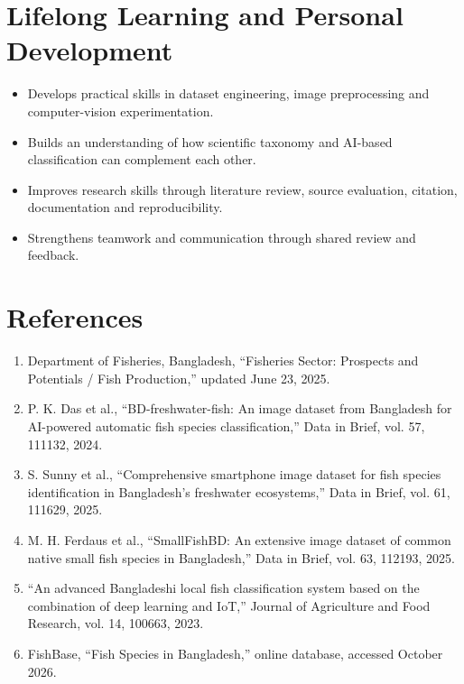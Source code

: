 \documentclass[12pt,a4paper]{article}
\begin{document}
\section{Lifelong Learning and Personal Development}
\begin{itemize}[leftmargin=0.35in]
    \item Develops practical skills in dataset engineering, image preprocessing and computer-vision experimentation.
    \item Builds an understanding of how scientific taxonomy and AI-based classification can complement each other.
    \item Improves research skills through literature review, source evaluation, citation, documentation and reproducibility.
    \item Strengthens teamwork and communication through shared review and feedback.
\end{itemize}


\section{References}

\begin{enumerate}
    \item \label{ref1} Department of Fisheries, Bangladesh, ``Fisheries Sector: Prospects and Potentials / Fish Production,'' updated June 23, 2025.
    \item \label{ref2} P. K. Das et al., ``BD-freshwater-fish: An image dataset from Bangladesh for AI-powered automatic fish species classification,'' Data in Brief, vol. 57, 111132, 2024.
    \item \label{ref3} S. Sunny et al., ``Comprehensive smartphone image dataset for fish species identification in Bangladesh's freshwater ecosystems,'' Data in Brief, vol. 61, 111629, 2025.
    \item \label{ref4} M. H. Ferdaus et al., ``SmallFishBD: An extensive image dataset of common native small fish species in Bangladesh,'' Data in Brief, vol. 63, 112193, 2025.
    \item \label{ref5} ``An advanced Bangladeshi local fish classification system based on the combination of deep learning and IoT,'' Journal of Agriculture and Food Research, vol. 14, 100663, 2023.
    \item \label{ref6} FishBase, ``Fish Species in Bangladesh,'' online database, accessed October 2026.
\end{enumerate}
\end{document}
